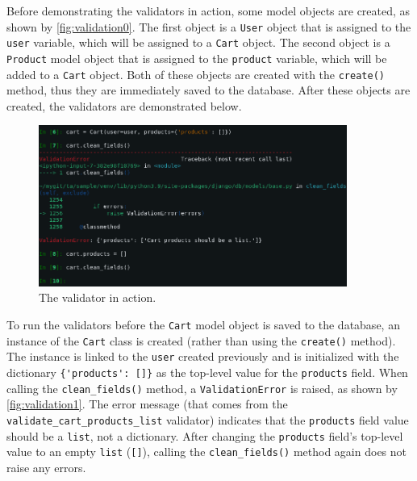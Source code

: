 Before demonstrating the validators in action, some model objects are created,
as shown by \autoref{fig:validation0}. The first object is a \verb|User| object
that is assigned to the \verb|user| variable, which will be assigned to a
\verb|Cart| object. The second object is a \verb|Product| model object that is
assigned to the \verb|product| variable, which will be added to a \verb|Cart|
object. Both of these objects are created with the \verb|create()| method,
thus they are immediately saved to the database. After these objects are
created, the validators are demonstrated below.

\begin{figure}
	\centering
    \includegraphics[width=0.90\textwidth]{pics/validation1.png}
	\caption{The  validator in action.}
	\label{fig:validation1}
\end{figure}

To run the validators before the \verb|Cart| model object is saved to the
database, an instance of the \verb|Cart| class is created (rather than using
the \verb|create()| method). The instance is linked to the \verb|user| created
previously and is initialized with the dictionary \verb|{'products': []}| as
the top-level value for the \verb|products| field. When calling the
\verb|clean_fields()| method, a \verb|ValidationError| is raised, as shown by
\autoref{fig:validation1}. The error message (that comes from the
\verb|validate_cart_products_list| validator) indicates that the
\verb|products| field value should be a \verb|list|, not a dictionary. After
changing the \verb|products| field's top-level value to an empty \verb|list|
(\verb|[]|), calling the \verb|clean_fields()| method again does not raise any
errors.

